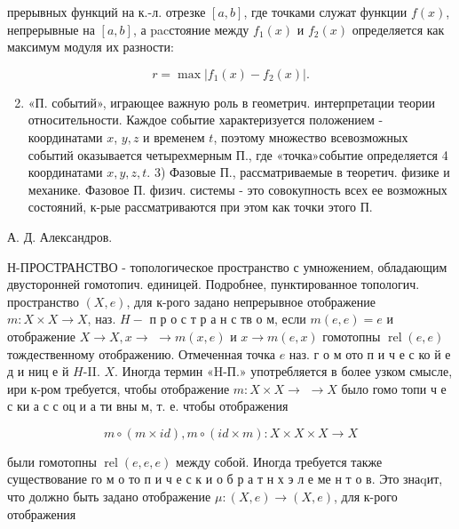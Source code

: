 \documentclass[10pt]{article}
\begin{document}
прерывных функций на к.-л. отрезке $[a, b]$, где точками служат функции $f(x)$, непрерывные на $[a, b]$, а pacстояние между $f_{1}(x)$ и $f_{2}(x)$ определяется как максимум модуля их разности:



\[

r=\max \left|f_{1}(x)-f_{2}(x)\right| .

\]



\begin{enumerate}

  \setcounter{enumi}{1}

  \item «П. событий», играющее важную роль в геометрич. интерпретации теории относительности. Каждое событие характеризуется положением - координатами $x$, $y, z$ и временем $t$, поэтому множество всевозможных событий оказывается четырехмерным П., где «точка»событие определяется 4 координатами $x, y, z, t$. 3) Фазовые П., рассматриваемые в теоретич. физике и механике. Фазовое П. физич. системы - это совокупность всех ее возможных состояний, к-рые рассматриваются при этом как точки этого П.

\end{enumerate}



А. Д. Александров.



Н-ПРОСТРАНСТВО - топологическое пространство с умножением, обладающим двусторонней гомотопич. единицей. Подробнее, пунктированное топологич. пространство $(X, e)$, для к-рого задано непрерывное отображение $m: X \times X \rightarrow X$, наз. $H-$ п р о с т р а н с тв о м, если $m(e, e)=e$ и отображение $X \rightarrow X, x \rightarrow$ $\rightarrow m(x, e)$ и $x \rightarrow m(e, x)$ гомотопны $\operatorname{rel}(e, e)$ тождественному отображению. Отмеченная точка $e$ наз. г о м ото п и ч е с ко й е д и ниц е й $H$-II. $X$. Иногда термин «H-П.» употребляется в более узком смысле, ири к-ром требуется, чтобы отображение $m: X \times X \rightarrow$ $\rightarrow X$ было гомо топи ч е с ки а с с оц и а ти вны м, т. е. чтобы отображения



\[

m \circ(m \times i d), m \circ(i d \times m): X \times X \times X \rightarrow X

\]



были гомотопны $\operatorname{rel}(e, e, e)$ между собой. Иногда требуется также существование го м о то п и ч е с к и о б р а т н х э л е ме н т о в. Это знаqит, что должно быть задано отображение $\mu:(X, e) \rightarrow(X, e)$, для к-рого отображения
\end{document}
